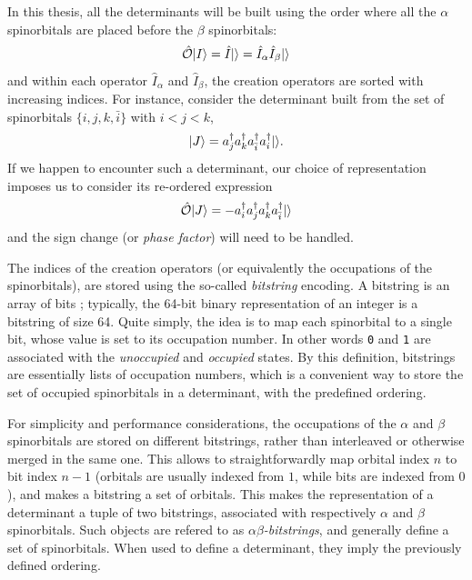 \documentclass[./thesis.tex]{subfiles}
\begin{document}
In this thesis, all the determinants will be built using the order where all the $\alpha$ spinorbitals are placed before the $\beta$ spinorbitals:
\begin{equation}
\label{eq:spinpack}
{\hat{\mathcal{O}}} {\ket{I}} = \hat{I} {\ket{}} = \hat{I}_\alpha \hat{I}_\beta {\ket{}} 
\end{equation}
and within each operator $\hat{I}_\alpha$ and $\hat{I}_\beta$, the creation operators are sorted with increasing indices.
For instance, consider the determinant built from the set of spinorbitals $\{i,j,k,{\bar i} \}$ with $i<j<k$,
\begin{equation}
{\ket{J}} = a^\dagger_{j} a^\dagger_{k} a^\dagger_{\bar i} a^\dagger_{i} {\ket{}}.
\end{equation}
If we happen to encounter such a determinant, our choice of representation imposes us to consider its re-ordered expression
\begin{equation}
{\hat{\mathcal{O}}} {\ket{J}} = - a^\dagger_{i} a^\dagger_{j} a^\dagger_{k} a^\dagger_{\bar i} {\ket{}} 
\end{equation}
and the sign change (or \emph{phase factor}) will need to be handled.

The indices of the creation operators (or equivalently the
occupations of the spinorbitals), are stored using the so-called \emph{bitstring} encoding. A bitstring is an array of bits ; typically, the 64-bit binary representation of an integer is a bitstring of size 64.
Quite simply, the idea is to map each spinorbital to a single bit, whose value is set to its occupation number. In other words \texttt{0} and \texttt{1} are associated with the \emph{unoccupied} and \emph{occupied} states.
By this definition, bitstrings are essentially lists of occupation numbers, which is a convenient way to
store the set of occupied spinorbitals in a determinant, with the predefined ordering.

For simplicity and performance considerations, the occupations of the $\alpha$ and $\beta$ spinorbitals are stored on different bitstrings, rather than interleaved or otherwise merged in the same one. This allows to straightforwardly map orbital index $n$ to bit index $n-1$ (orbitals are usually indexed from $1$, while bits are indexed from $0$), and makes a bitstring a set of orbitals.
This makes the representation of a determinant a tuple of two bitstrings, associated with respectively $\alpha$ and $\beta$ spinorbitals. Such objects are refered to as \emph{$\alpha \beta$-bitstrings}, and generally define a set of spinorbitals. When used to define a determinant, they imply the previously defined ordering.
\end{document}
